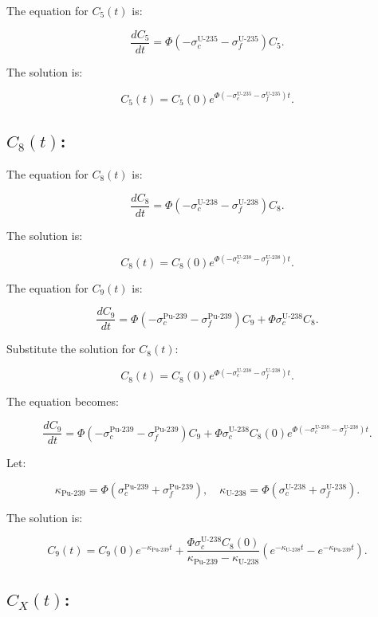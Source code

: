 \documentclass[11pt,a4paper]{article}
\begin{document}
The equation for \(C_5(t)\) is:

\[
\frac{dC_5}{dt} = \Phi \left(-\sigma_c^{\text{U-235}} - \sigma_f^{\text{U-235}}\right) C_5.
\]

The solution is:

\[
C_5(t) = C_5(0) e^{\Phi \left(-\sigma_c^{\text{U-235}} - \sigma_f^{\text{U-235}}\right) t}.
\]

\subsection*{\(C_8(t)\):}

The equation for \(C_8(t)\) is:

\[
\frac{dC_8}{dt} = \Phi \left(-\sigma_c^{\text{U-238}} - \sigma_f^{\text{U-238}}\right) C_8.
\]

The solution is:

\[
C_8(t) = C_8(0) e^{\Phi \left(-\sigma_c^{\text{U-238}} - \sigma_f^{\text{U-238}}\right) t}.
\]

The equation for \(C_9(t)\) is:

\[
\frac{dC_9}{dt} = \Phi \left(-\sigma_c^{\text{Pu-239}} - \sigma_f^{\text{Pu-239}}\right) C_9 + \Phi \sigma_c^{\text{U-238}} C_8.
\]

Substitute the solution for \(C_8(t)\):

\[
C_8(t) = C_8(0) e^{\Phi \left(-\sigma_c^{\text{U-238}} - \sigma_f^{\text{U-238}}\right) t}.
\]

The equation becomes:

\[
\frac{dC_9}{dt} = \Phi \left(-\sigma_c^{\text{Pu-239}} - \sigma_f^{\text{Pu-239}}\right) C_9 + \Phi \sigma_c^{\text{U-238}} C_8(0) e^{\Phi \left(-\sigma_c^{\text{U-238}} - \sigma_f^{\text{U-238}}\right) t}.
\]

Let:

\[
\kappa_{\text{Pu-239}} = \Phi \left(\sigma_c^{\text{Pu-239}} + \sigma_f^{\text{Pu-239}}\right), \quad
\kappa_{\text{U-238}} = \Phi \left(\sigma_c^{\text{U-238}} + \sigma_f^{\text{U-238}}\right).
\]

The solution is:

\[
C_9(t) = C_9(0) e^{-\kappa_{\text{Pu-239}} t} + \frac{\Phi \sigma_c^{\text{U-238}} C_8(0)}{\kappa_{\text{Pu-239}} - \kappa_{\text{U-238}}} \left(e^{-\kappa_{\text{U-238}} t} - e^{-\kappa_{\text{Pu-239}} t}\right).
\]

\subsection*{\(C_X(t)\):}
\end{document}
